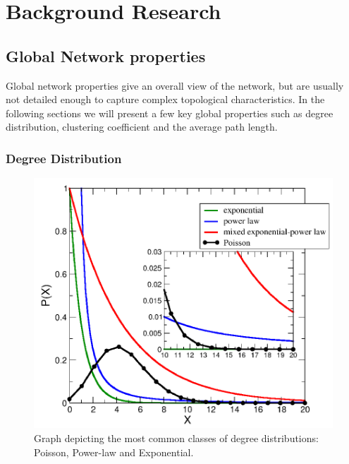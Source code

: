 \chapter{Background Research}

\section{Global Network properties}

Global network properties give an overall view of the network, but are usually
not detailed enough to capture complex topological characteristics. In the
following sections we will present a few key global properties such as degree
distribution, clustering coefficient and the average path length.

\subsection{Degree Distribution}

\begin{figure}[h]
  \centering
\includegraphics[scale=0.66]{images/deg_dist_all.png}
\caption{Graph depicting the most common classes of degree distributions:
Poisson, Power-law and Exponential.}
\label{fig:deg_dist_all}
\end{figure}

